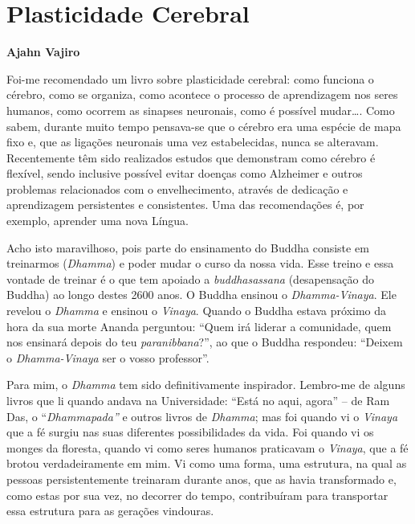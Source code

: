 \chapter{Plasticidade Cerebral}

\textbf{Ajahn Vajiro}

Foi-me recomendado um livro sobre plasticidade cerebral: como funciona o
cérebro, como se organiza, como acontece o processo de aprendizagem nos
seres humanos, como ocorrem as sinapses neuronais, como é possível
mudar\ldots{}. Como sabem, durante muito tempo pensava-se que o cérebro
era uma espécie de mapa fixo e, que as ligações neuronais uma vez
estabelecidas, nunca se alteravam. Recentemente têm sido realizados
estudos que demonstram como cérebro é flexível, sendo inclusive possível
evitar doenças como Alzheimer e outros problemas relacionados com o
envelhecimento, através de dedicação e aprendizagem persistentes e
consistentes. Uma das recomendações é, por exemplo, aprender uma nova
Língua.

Acho isto maravilhoso, pois parte do ensinamento do Buddha consiste em
treinarmos (\emph{Dhamma}) e poder mudar o curso da nossa vida. Esse
treino e essa vontade de treinar é o que tem apoiado a
\emph{buddhasassana} (desapensação do Buddha) ao longo destes 2600 anos.
O Buddha ensinou o \emph{Dhamma-Vinaya}. Ele revelou o \emph{Dhamma} e
ensinou o \emph{Vinaya}. Quando o Buddha estava próximo da hora da sua
morte Ananda perguntou: ``Quem irá liderar a comunidade, quem nos
ensinará depois do teu \emph{paranibbana}?'', ao que o Buddha respondeu:
``Deixem o \emph{Dhamma-Vinaya} ser o vosso professor''.

Para mim, o \emph{Dhamma} tem sido definitivamente inspirador. Lembro-me
de alguns livros que li quando andava na Universidade: ``Está no aqui,
agora'' -- de Ram Das, o ``\emph{Dhammapada''} e outros livros de
\emph{Dhamma}; mas foi quando vi o \emph{Vinaya} que a fé surgiu nas
suas diferentes possibilidades da vida. Foi quando vi os monges da
floresta, quando vi como seres humanos praticavam o \emph{Vinaya}, que a
fé brotou verdadeiramente em mim. Vi como uma forma, uma estrutura, na
qual as pessoas persistentemente treinaram durante anos, que as havia
transformado e, como estas por sua vez, no decorrer do tempo,
contribuíram para transportar essa estrutura para as gerações vindouras.

